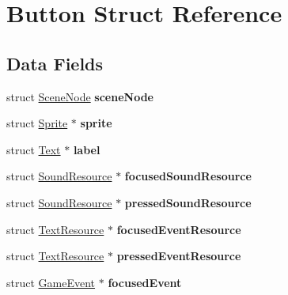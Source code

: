 \hypertarget{struct_button}{}\section{Button Struct Reference}
\label{struct_button}
\subsection*{Data Fields}
\begin{DoxyCompactItemize}
\item 
\hypertarget{struct_button_aca8025f56fb4ce20b974ec9a3292a9e4}{}\label{struct_button_aca8025f56fb4ce20b974ec9a3292a9e4} 
struct \hyperlink{struct_scene_node}{Scene\+Node} {\bfseries scene\+Node}
\item 
\hypertarget{struct_button_a1128327f94baacb1570a98fca0591108}{}\label{struct_button_a1128327f94baacb1570a98fca0591108} 
struct \hyperlink{struct_sprite}{Sprite} $\ast$ {\bfseries sprite}
\item 
\hypertarget{struct_button_ab278201aa1758916bc9e825b3833e31b}{}\label{struct_button_ab278201aa1758916bc9e825b3833e31b} 
struct \hyperlink{struct_text}{Text} $\ast$ {\bfseries label}
\item 
\hypertarget{struct_button_a8848ee5b886f588a966fc6c3ff0270df}{}\label{struct_button_a8848ee5b886f588a966fc6c3ff0270df} 
struct \hyperlink{struct_sound_resource}{Sound\+Resource} $\ast$ {\bfseries focused\+Sound\+Resource}
\item 
\hypertarget{struct_button_a9d6a7ab6b4708d54a3e7da0a665609b2}{}\label{struct_button_a9d6a7ab6b4708d54a3e7da0a665609b2} 
struct \hyperlink{struct_sound_resource}{Sound\+Resource} $\ast$ {\bfseries pressed\+Sound\+Resource}
\item 
\hypertarget{struct_button_aff7dcf845e86b8d62077ceec6094f3e3}{}\label{struct_button_aff7dcf845e86b8d62077ceec6094f3e3} 
struct \hyperlink{struct_text_resource}{Text\+Resource} $\ast$ {\bfseries focused\+Event\+Resource}
\item 
\hypertarget{struct_button_a4f009b181e2d1679d58eeb638c79f1f7}{}\label{struct_button_a4f009b181e2d1679d58eeb638c79f1f7} 
struct \hyperlink{struct_text_resource}{Text\+Resource} $\ast$ {\bfseries pressed\+Event\+Resource}
\item 
\hypertarget{struct_button_af8909553495b609dc7c9efd469ffc31d}{}\label{struct_button_af8909553495b609dc7c9efd469ffc31d} 
struct \hyperlink{struct_game_event}{Game\+Event} $\ast$ {\bfseries focused\+Event}
\item 
\hypertarget{struct_button_a6c6350ebecb76824f44acd4af5310894}{}\label{struct_button_a6c6350ebecb76824f44acd4af5310894} 

\end{DoxyCompactItemize}
